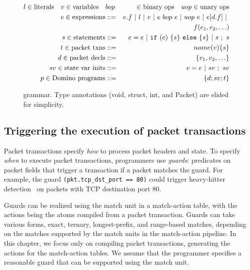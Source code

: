 \begin{figure}
\newcommand{\sep}{~|~}
\begin{small}
\begin{eqnarray*}
l \in \text{literals} \quad v \in \text{variables} \quad &bop& \in \text{binary ops} \quad
uop \in \text{unary ops} \\
%
e \in \text{expressions} &::=& e.f \sep l \sep v \sep e~bop~e \sep uop~e \sep e[d.f] \sep \\
                   & &   f(e_1, e_2, \ldots) \\
%
s \in \text{statements} &::=& e = e \sep {\tt if}~(e)~\{ s \}~{\tt else}~ \{ s \} \sep s~;~s \\
%
t \in \text{packet txns} &::=& name(v) \{ s \} \\
%
%
d \in \text{packet decls} &::=& \{ v_1, v_2, \ldots \} \\
%
sv \in \text{state var inits} &::=& v = e \sep sv~;~sv \\
%
p \in \text{\pktlanguage programs} &::=& \{ d ; sv; t \}
\end{eqnarray*}
\end{small}
\caption{\pktlanguage grammar. Type annotations (void, struct, int, and Packet) are elided for simplicity.}
\label{fig:grammar}
\end{figure}

\subsection{Triggering the execution of packet transactions}
\label{ss:guards}
Packet transactions specify \textit{how} to process packet headers and state.
To specify {\em when} to execute packet transactions, programmers use {\em
guards}: predicates on packet fields that trigger a transaction if a packet
matches the guard. For example, the guard {\tt (pkt.tcp\_dst\_port == 80)}
could trigger heavy-hitter detection~\cite{opensketch} on packets with TCP
destination port 80.

Guards can be realized using the match unit in a match-action table, with the
actions being the atoms compiled from a packet transaction. Guards can take
various forms, \eg exact, ternary, longest-prefix, and range-based matches,
depending on the matches supported by the match units in the match-action
pipeline. In this chapter, we focus only on compiling packet transactions, \ie
generating the actions for the match-action tables. We assume that the
programmer specifies a reasonable guard that can be supported using the match
unit.

